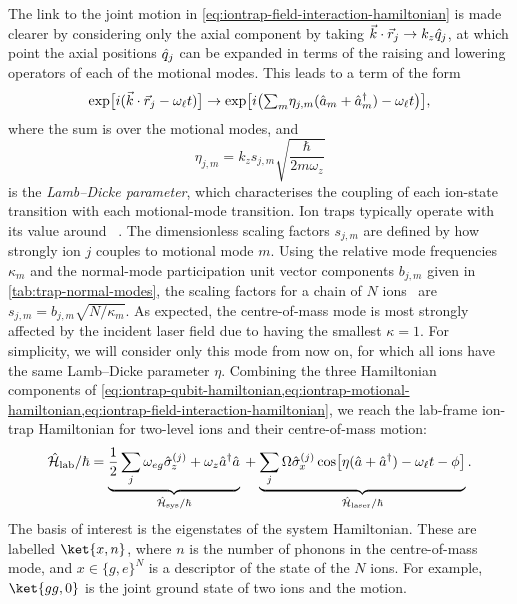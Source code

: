 The link to the joint motion in \cref{eq:iontrap-field-interaction-hamiltonian} is made clearer by considering only the axial component by taking $\vec k\cdot \vec r_j \to k_z\hat{q}_j$, at which point the axial positions $\hat{q}_j$ can be expanded in terms of the raising and lowering operators of each of the motional modes.
This leads to a term of the form
\begin{equation}
\exp\bigl[i(\vec k\cdot \vec r_j - \omega_\ell t)\bigr] \to \exp\bigl[i\bigl({\textstyle\sum_m} \eta_{j,m}(\hat{a}_m + \hat{a}^\dagger_m) - \omega_\ell t\bigr)\bigr],
\end{equation}
where the sum is over the motional modes, and
\begin{equation}
\eta_{j,m} = k_z s_{j,m} \sqrt{\frac\hbar{2m\omega_z}}
\end{equation}
is the \emph{Lamb--Dicke parameter}, which characterises the coupling of each ion-state transition with each motional-mode transition.
Ion traps typically operate with its value around ~\cite{Corfield2022,Schaefer2018}.
The dimensionless scaling factors $s_{j,m}$ are defined by how strongly ion $j$ couples to motional mode $m$.
Using the relative mode frequencies $\kappa_m$ and the normal-mode participation unit vector components $b_{j,m}$ given in \cref{tab:trap-normal-modes}, the scaling factors for a chain of $N$ ions~\cite{James1998} are $s_{j,m} = b_{j,m}\sqrt{N/\kappa_m}$.
As expected, the centre-of-mass mode is most strongly affected by the incident laser field due to having the smallest $\kappa = 1$.
For simplicity, we will consider only this mode from now on, for which all ions have the same Lamb--Dicke parameter $\eta$.
Combining the three Hamiltonian components of \cref{eq:iontrap-qubit-hamiltonian,eq:iontrap-motional-hamiltonian,eq:iontrap-field-interaction-hamiltonian}, we reach the lab-frame ion-trap Hamiltonian for two-level ions and their centre-of-mass motion:
\begin{equation}\label{eq:iontrap-lab-hamiltonian}
\hat{\mathcal H}_{\text{lab}}/\hbar =
    \underbrace{\frac12\sum_j \omega_{eg}\hat{\sigma}_{\mkern-1mu z}^{(j)} + \omega_z\hat{a}^\dagger\hat{a}}_{\hat{\mathcal H}_{\text{sys}}/\hbar}
    {}+
    \underbrace{\sum_j\Omega\hat{\sigma}_{\mkern-1mu x}^{(j)}\cos\bigl[\eta(\hat{a} + \hat{a}^\dagger) - \omega_\ell t - \phi\bigr]}_{\hat{\mathcal H}_{\text{laser}}/\hbar}.
\end{equation}
The basis of interest is the eigenstates of the system Hamiltonian.
These are labelled $\ket{x,n}$, where $n$ is the number of phonons in the centre-of-mass mode, and $x\in{\{g,e\}}^N$ is a descriptor of the state of the $N$ ions.
For example, $\ket{gg,0}$ is the joint ground state of two ions and the motion.

